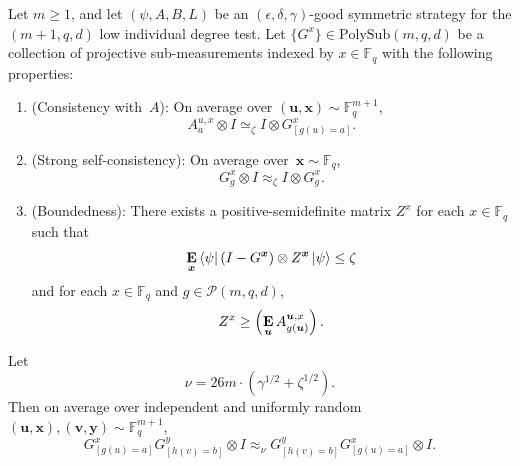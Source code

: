 \documentclass[11pt]{article}
\theoremstyle{definition}
\newcommand{\E}{\mathop{\bf E\/}}
\newcommand{\F}{\mathbb F}
\newcommand{\eps}{\epsilon}
\newcommand{\ot}{\otimes}
\newcommand{\calP}{\mathcal{P}}
\newcommand{\bu}{\boldsymbol{u}}
\newcommand{\bv}{\boldsymbol{v}}
\newcommand{\bx}{{\boldsymbol{x}}}
\newcommand{\by}{\boldsymbol{y}}
\newcommand{\polyfunc}[3]{\calP(#1, #2, #3)}
\newcommand{\polysub}[3]{\mathrm{PolySub}(#1, #2, #3)}
\begin{document}
\begin{lemma}
  \label{lem:comm-data-processed-g}
  Let $m\geq1$, and let $(\psi, A, B, L)$ be an $(\eps, \delta, \gamma)$-good symmetric strategy for the $(m+1,q,d)$ low individual degree test.
  Let $\{G^x\} \in \polysub{m}{q}{d}$ be a collection of projective sub-measurements indexed by $x \in \F_q$ with the following properties:
  \begin{enumerate}
  \item (Consistency with~$A$): \label{item:data-processed-consistency} On average over $(\bu, \bx) \sim \F_q^{m+1}$,
	  \begin{equation*}
	  A^{u, x}_a \otimes I \simeq_{\zeta} I \otimes G^x_{[g(u)=a]}.
	  \end{equation*}
  \item (Strong self-consistency): \label{item:data-processed-self-consistency} On average over~$\bx \sim \F_q$,
	\begin{equation*}
		G^x_g \otimes I \approx_{\zeta} I \otimes G^x_g.
	\end{equation*}
  \item (Boundedness): \label{item:data-processed-boundedness} There exists a positive-semidefinite matrix $Z^x$ for each $x \in \F_q$ such that
	\begin{equation*}
		\E_{\bx} \bra{\psi} (I-G^{\bx})\otimes Z^{\bx} \ket{\psi} \leq \zeta
	\end{equation*}
	and for each $x \in \F_q$ and $g \in \polyfunc{m}{q}{d}$,
	\begin{equation*}
	 Z^x \geq \left(\E_{\bu} A^{\bu, x}_{g(\bu)}\right).
	\end{equation*}
  \end{enumerate}
  Let
  \begin{equation*}
  \nu = 26 m \cdot (\gamma^{1/2} + \zeta^{1/2}).
  \end{equation*}
  Then on average over independent and uniformly random $(\bu,\bx), (\bv,\by) \sim \F_q^{m+1}$,
  \begin{equation*}
    G^x_{[g(u) = a]} G^y_{[h(v) = b]} \ot I \approx_{\nu} G^y_{[h(v) = b]}
    G^x_{[g(u) = a]} \ot I.
  \end{equation*}
\end{lemma}
\end{document}
